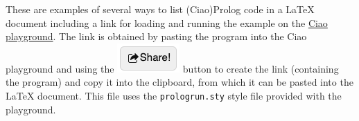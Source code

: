 \documentclass{article}
\begin{document}
\vspace*{-5mm}
\thispagestyle{empty}

\noindent
These are examples of several ways to list (Ciao)Prolog code in a
LaTeX document including a link for loading and running the
example on the \href{https://ciao-lang.org/playground}{Ciao
  playground}. The link is obtained by pasting the program into the
Ciao playground and using the
\includegraphics[scale=.4,trim=0 12 0 0]{ShareLight.png} button to
create the link (containing the program) and copy it into the
clipboard, from which it can be pasted into the LaTeX
document. This file uses the \texttt{prologrun.sty} style file provided with the playground.\\ [-3mm]
\end{document}
